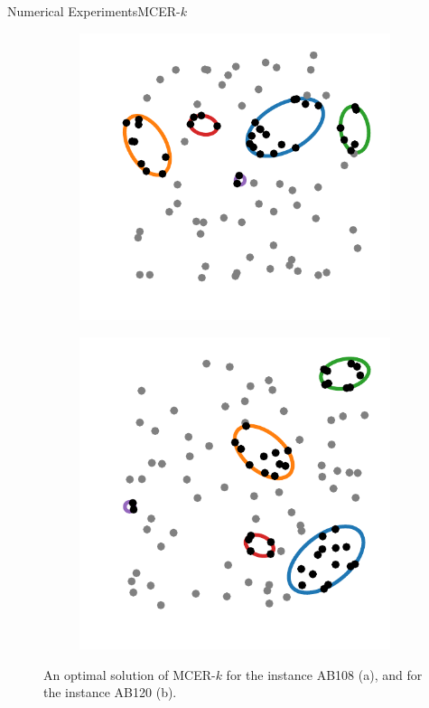\documentclass{beamer}
\theoremstyle{definition}
\begin{document}
\begin{frame}{Numerical Experiments}{MCER-$k$}
	\begin{figure}[!htb]
		
		\begin{subfigure}{.44\textwidth}
			\centering
			\includegraphics[scale=.6]{../article/figures/MCER_AB108}
			\caption{}
			\label{fig:AB108}
		\end{subfigure}
		\begin{subfigure}{.44\textwidth}
			\centering
			\includegraphics[scale=.6]{../article/figures/MCER_AB120}
			\caption{}
			\label{fig:AB120}
		\end{subfigure}
		\caption{An optimal solution of MCER-$k$ for the instance AB108 (a), and for the instance AB120 (b).}
		\label{fig:AB108-AB120}
	\end{figure}
\end{frame}
\end{document}
